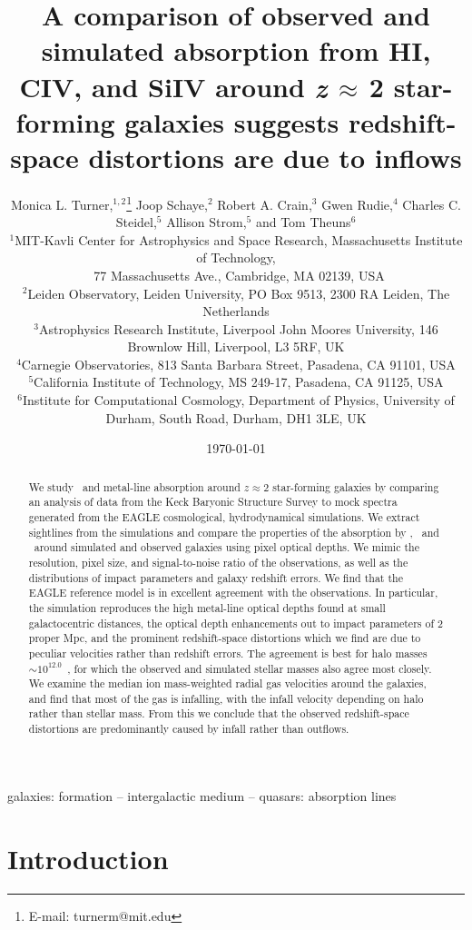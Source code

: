 \documentclass[useAMS,usenatbib,letterpaper]{mn2e}
\title[Evidence for inflows around \textit{z}$\, \approx\,$2 star-forming galaxies]
{A comparison of observed and simulated absorption from HI, CIV, and SiIV 
around \textit{z}$\, \approx\,$2 star-forming galaxies suggests 
redshift-space distortions are due to inflows}
\author[Turner et al.]{Monica L. Turner,$^{1,2}$\thanks{E-mail: turnerm@mit.edu}
Joop Schaye,$^{2}$
Robert A. Crain,$^{3}$
Gwen Rudie,$^{4}$\newauthor
Charles C. Steidel,$^{5}$
Allison Strom,$^{5}$
and
Tom Theuns$^{6}$\\
$^{1}$MIT-Kavli Center for Astrophysics and Space Research, 
   Massachusetts Institute of Technology, \\
  \,  77 Massachusetts Ave., Cambridge, MA 02139, USA\\
$^{2}$Leiden Observatory, Leiden University, PO Box 9513, 2300 RA Leiden, The Netherlands\\
$^{3}$Astrophysics Research Institute, Liverpool John Moores University, 146 Brownlow Hill, Liverpool, L3 5RF, UK\\
$^{4}$Carnegie Observatories, 813 Santa Barbara Street, Pasadena, CA 91101, USA\\
$^{5}$California Institute of Technology, MS 249-17, Pasadena, CA 91125, USA\\
$^{6}$Institute for Computational Cosmology, Department of Physics, University of Durham, South Road, Durham, DH1 3LE, UK\\
}
\begin{document}
	

\date{\today}

\pagerange{\pageref{firstpage}--\pageref{LastPage}} 

\maketitle

\label{firstpage}

\begin{abstract}
We study \hone\ and metal-line absorption around $z\approx2$ star-forming galaxies by
comparing an analysis of data  from the Keck
Baryonic Structure Survey to mock spectra generated from the EAGLE cosmological,
hydrodynamical simulations. We extract sightlines from the simulations
and compare the properties of the absorption by \hone, \cfour\ and \sifour\ around
simulated and observed galaxies using pixel optical depths. We
mimic the resolution, pixel size, and signal-to-noise
ratio of the observations, as well as the distributions of impact
parameters and galaxy redshift errors. We find that 
the EAGLE reference model is in excellent agreement with the observations. 
In particular, the simulation reproduces the high
metal-line optical depths found at small galactocentric distances, the
optical depth enhancements out to impact parameters of
2 proper Mpc, and the prominent redshift-space distortions which we
find are due to peculiar velocities rather than redshift errors. The
agreement is best for halo masses $\sim10^{12.0}$~\msol, for which the 
observed and simulated stellar masses also agree most closely. We
examine the median ion mass-weighted radial gas velocities around the galaxies,
and find that most of the gas is infalling, with the infall velocity depending 
on halo rather than stellar mass.  From this we
conclude that the observed redshift-space distortions are predominantly caused by
infall rather than outflows.
\end{abstract}

\begin{keywords}
galaxies: formation -- intergalactic medium -- quasars: absorption lines 
\end{keywords}	




\section{Introduction}
\label{sec:intro}
\end{document}
